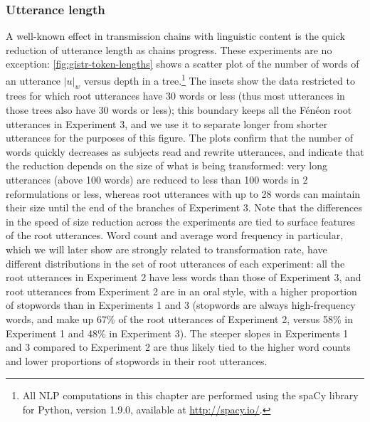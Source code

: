\subsubsection{Utterance length}\label{utterance-length}

A well-known effect in transmission chains with linguistic content is
the quick reduction of utterance length as chains progress. These
experiments are no exception: \cref{fig:gistr-token-lengths} shows a
scatter plot of the number of words of an utterance \(|u|_w\) versus
depth in a tree.\footnote{All NLP computations in this chapter are
  performed using the spaCy library for Python, version 1.9.0, available
  at \url{http://spacy.io/}.} The insets show the data restricted to
trees for which root utterances have 30 words or less (thus most
utterances in those trees also have 30 words or less); this boundary
keeps all the Fénéon root utterances in Experiment 3, and we use it to
separate longer from shorter utterances for the purposes of this figure.
The plots confirm that the number of words quickly decreases as subjects
read and rewrite utterances, and indicate that the reduction depends on
the size of what is being transformed: very long utterances (above 100
words) are reduced to less than 100 words in 2 reformulations or less,
whereas root utterances with up to 28 words can maintain their size
until the end of the branches of Experiment 3. Note that the differences
in the speed of size reduction across the experiments are tied to
surface features of the root utterances. Word count and average word
frequency in particular, which we will later show are strongly related
to transformation rate, have different distributions in the set of root
utterances of each experiment: all the root utterances in Experiment 2
have less words than those of Experiment 3, and root utterances from
Experiment 2 are in an oral style, with a higher proportion of stopwords
than in Experiments 1 and 3 (stopwords are always high-frequency words,
and make up 67\% of the root utterances of Experiment 2, versus 58\% in
Experiment 1 and 48\% in Experiment 3). The steeper slopes in
Experiments 1 and 3 compared to Experiment 2 are thus likely tied to the higher
word counts and lower proportions of stopwords in their root utterances.

